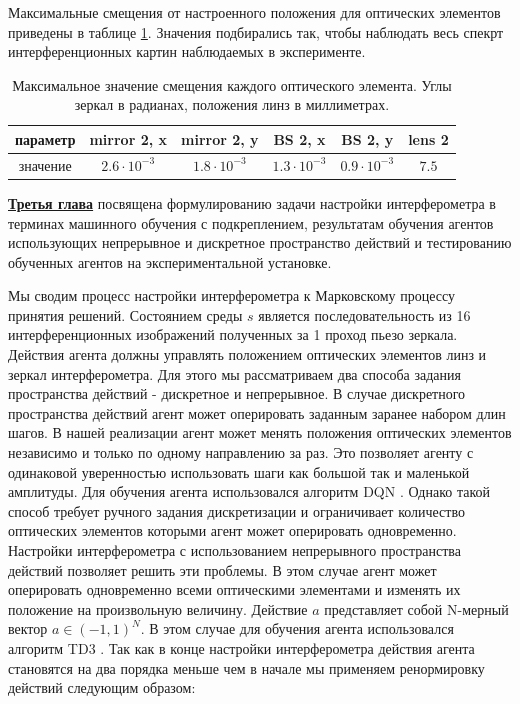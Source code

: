Максимальные смещения от настроенного положения для оптических элементов приведены в таблице \ref{tab:interf_dyn_params}. Значения подбирались так, чтобы наблюдать весь спекрт интерференционных картин наблюдаемых в эксперименте.

\begin{table} [htbp]
    \centering
    \begin{threeparttable}%
        \caption{Максимальное значение смещения каждого оптического элемента. Углы зеркал в радианах, положения линз в миллиметрах.}
        \begin{tabular}{|c|c|c|c|c|c|}
            \hline
            \hline
            параметр & mirror 2, x & mirror 2, y & BS 2, x & BS 2, y & lens 2 \\
            \hline
            значение & $2.6 \cdot 10^{-3}$ & $1.8 \cdot 10^{-3}$ & $1.3 \cdot 10^{-3}$ & $0.9 \cdot 10^{-3}$ & $7.5$ \\
            \hline
            \hline
        \end{tabular}
        \label{tab:interf_dyn_params}
    \end{threeparttable}
\end{table}


\underline{\textbf{Третья глава}} посвящена формулированию задачи настройки интерферометра в терминах машинного обучения с подкреплением, результатам обучения агентов использующих непрерывное и дискретное пространство действий и тестированию обученных агентов на экспериментальной установке. 

Мы сводим процесс настройки интерферометра к Марковскому процессу принятия решений. Состоянием среды $s$ является последовательность из 16 интерференционных изображений полученных за 1 проход пьезо зеркала. Действия агента должны управлять положением оптических элементов линз и зеркал интерферометра. Для этого мы рассматриваем два способа задания пространства действий - дискретное и непрерывное. В случае дискретного пространства действий агент может оперировать заданным заранее набором длин шагов. В нашей реализации агент может менять положения оптических элементов независимо и только по одному направлению за раз. Это позволяет агенту с одинаковой уверенностью использовать шаги как большой так и маленькой амплитуды. Для обучения агента использовался алгоритм DQN \cite{dqn}.  Однако такой способ требует ручного задания дискретизации и ограничивает количество оптических элементов которыми агент может оперировать одновременно. Настройки интерферометра с использованием непрерывного пространства действий позволяет решить эти проблемы. В этом случае агент может оперировать одновременно всеми оптическими элементами и изменять их положение на произвольную величину. Действие $a$ представляет собой N-мерный вектор $a \in (-1, 1)^{N}$. 
В этом случае для обучения агента использовался алгоритм TD3 \cite{ddpg}.
Так как в конце настройки интерферометра действия агента становятся на два порядка меньше чем в начале мы применяем ренормировку действий следующим образом: 

